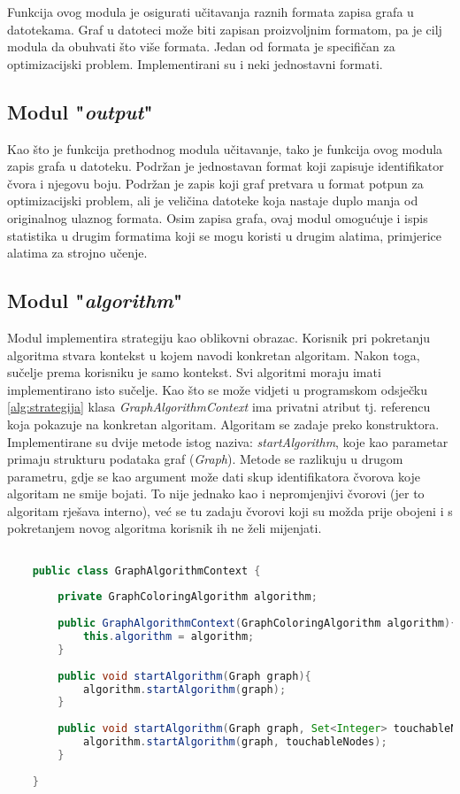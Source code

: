 \documentclass[times, utf8, diplomski, numeric]{fer}
\begin{document}
Funkcija ovog modula je osigurati učitavanja raznih formata zapisa grafa u datotekama. Graf u datoteci može biti zapisan proizvoljnim formatom, pa je cilj modula da obuhvati što više formata. Jedan od formata je specifičan za optimizacijski problem. Implementirani su i neki jednostavni formati. 

\subsection{Modul "\emph{output}"}

Kao što je funkcija prethodnog modula učitavanje, tako je funkcija ovog modula zapis grafa u datoteku. Podržan je jednostavan format koji zapisuje identifikator čvora i njegovu boju. Podržan je zapis koji graf pretvara u format potpun za optimizacijski problem, ali je veličina datoteke koja nastaje duplo manja od originalnog ulaznog formata. Osim zapisa grafa, ovaj modul omogućuje i ispis statistika u drugim formatima koji se mogu koristi u drugim alatima, primjerice alatima za strojno učenje.

\subsection{Modul "\emph{algorithm}"}

Modul implementira strategiju kao oblikovni obrazac. Korisnik pri pokretanju algoritma stvara kontekst u kojem navodi konkretan algoritam. Nakon toga, sučelje prema korisniku je samo kontekst. Svi algoritmi moraju imati implementirano isto sučelje. Kao što se može vidjeti u programskom odsječku \ref{alg:strategija} klasa \emph{GraphAlgorithmContext} ima privatni atribut tj. referencu koja pokazuje na konkretan algoritam. Algoritam se zadaje preko konstruktora. Implementirane su dvije metode istog naziva: \emph{startAlgorithm}, koje kao parametar primaju strukturu podataka graf (\emph{Graph}). Metode se razlikuju u drugom parametru, gdje se kao argument može dati skup identifikatora čvorova koje algoritam ne smije bojati. To nije jednako kao i nepromjenjivi čvorovi (jer to algoritam rješava interno), već se tu zadaju čvorovi koji su možda prije obojeni i s pokretanjem novog algoritma korisnik ih ne želi mijenjati. 

\begin{singlespace}
	\begin{lstlisting}[label=alg:strategija, language=Java, caption=Definicija klase i metoda za oblikovni obrazac strategija]

	public class GraphAlgorithmContext {
	
		private GraphColoringAlgorithm algorithm;
	
		public GraphAlgorithmContext(GraphColoringAlgorithm algorithm){
			this.algorithm = algorithm;
		}
	
		public void startAlgorithm(Graph graph){
			algorithm.startAlgorithm(graph);
		}
	
		public void startAlgorithm(Graph graph, Set<Integer> touchableNodes){
			algorithm.startAlgorithm(graph, touchableNodes);
		}
	
	}

	\end{lstlisting}
\end{singlespace}
\end{document}
